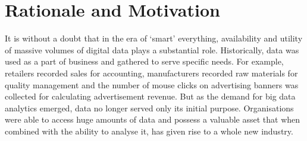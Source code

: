 \section{Rationale and Motivation}

It is without a doubt that in the era of `smart' everything, availability and utility of massive volumes of digital data plays a substantial role. Historically, data was used as a part of business and gathered to serve specific needs. For example, retailers recorded sales for accounting, manufacturers recorded raw materials for quality management and the number of mouse clicks on advertising banners was collected for calculating advertisement revenue. But as the demand for big data analytics emerged, data no longer served only its initial purpose. Organisations were able to access huge amounts of data and possess a valuable asset that when combined with the ability to analyse it, has given rise to a whole new industry.

